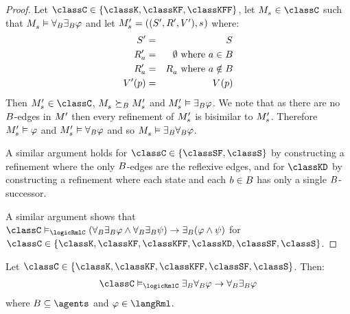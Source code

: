 \begin{proof}
Let $\classC \in \{\classK, \classKF, \classKFF\}$, let $\kPModel{\kStateS} \in \classC$ such that $\kPModel{\kStateS} \entails \allrefsBs \somerefsBs \phi$ and let $\kPModelAndTupleP{\kStateS}$ where:
\begin{eqnarray*}
    \kStatesP &=& \kStates\\
    \kAccessibilityPA &=& \emptyset \text{ where } \agentA \in \agentsB\\
    \kAccessibilityPA &=& \kAccessibilityA \text{ where } \agentA \notin \agentsB\\
    \kValuationP(\atomP) &=& \kValuation(\atomP)
\end{eqnarray*}
Then $\kPModelP{\kStateS} \in \classC$, $\kPModel{\kStateS} \simulatesBs \kPModelP{\kStateS}$ and $\kPModelP{\kStateS} \entails \somerefsBs \phi$.
We note that as there are no $B$-edges in ${M^{\prime}_{}}$ then every refinement of $\kPModelP{\kStateS}$ is bisimilar to $\kPModelP{\kStateS}$.
Therefore $\kPModelP{\kStateS} \entails \phi$ and $\kPModelP{\kStateS} \entails \allrefsBs \phi$ and so $\kPModel{\kStateS} \entails \somerefsBs \allrefsBs \phi$.

A similar argument holds for $\classC \in \{\classSF, \classS\}$ by constructing a refinement where the only $B$-edges are the reflexive edges,
and for $\classKD$ by constructing a refinement where each state and each $b \in B$ has only a single $B$-successor.

A similar argument shows that $\classC \entails_\logicRmlC (\allrefsBs \somerefsBs \phi \land \allrefsBs \somerefsBs \psi) \implies \somerefsBs (\phi \land \psi)$ for $\classC \in \{\classK, \classKF, \classKFF, \classKD, \classSF, \classS\}$.
\end{proof}

\begin{proposition}
Let $\classC \in \{\classK, \classKF, \classKFF, \classSF, \classS\}$. Then:
$$
\begin{array}{l}
    \classC \entails_\logicRmlC \somerefsBs \allrefsBs \phi \implies \allrefsBs \somerefsBs \phi
\end{array}
$$
where $\agentsB \subseteq \agents$ and $\phi \in \langRml$.
\end{proposition}

